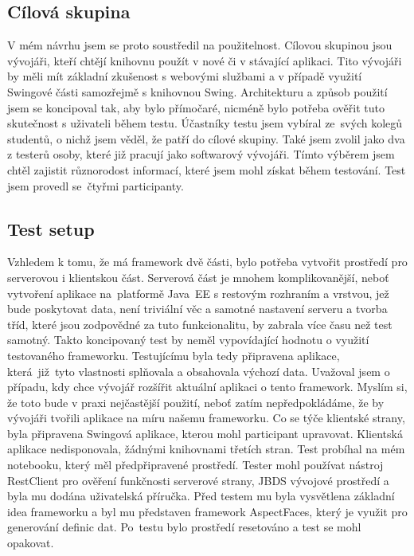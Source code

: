 \subsection{Cílová skupina}
V mém návrhu jsem se proto soustředil na použitelnost. Cílovou skupinou jsou vývojáři, kteří chtějí knihovnu použít v nové či v stávající aplikaci. Tito vývojáři by měli mít základní zkušenost s webovými službami a v případě využití Swingové části samozřejmě s knihovnou Swing. Architekturu a způsob použití jsem se koncipoval tak, aby bylo přímočaré, nicméně bylo potřeba ověřit tuto skutečnost s uživateli během testu. Účastníky testu jsem vybíral ze~svých kolegů studentů, o nichž jsem věděl, že patří do cílové skupiny. Také jsem zvolil jako dva z testerů osoby, které již pracují jako softwarový vývojáři. Tímto výběrem jsem chtěl zajistit různorodost informací, které jsem mohl získat během testování. Test jsem provedl se~čtyřmi participanty.

\subsection{Test setup}
Vzhledem k tomu, že má framework dvě části, bylo potřeba vytvořit prostředí pro serverovou i klientskou část. Serverová část je mnohem komplikovanější, neboť vytvoření aplikace na~platformě Java~EE s restovým rozhraním a vrstvou, jež bude poskytovat data, není triviální věc a samotné nastavení serveru a tvorba tříd, které jsou zodpovědné za tuto funkcionalitu, by zabrala více času než test samotný. Takto koncipovaný test by neměl vypovídající hodnotu o využití testovaného frameworku. Testujícímu byla tedy připravena aplikace, která~již~tyto vlastnosti splňovala a obsahovala výchozí data. Uvažoval jsem o případu, kdy chce vývojář rozšířit aktuální aplikaci o tento framework. Myslím si, že toto bude v praxi nejčastější použití, neboť zatím nepředpokládáme, že by vývojáři tvořili aplikace na míru našemu frameworku. Co se týče klientské strany, byla připravena Swingová aplikace, kterou mohl participant upravovat. Klientská aplikace nedisponovala, žádnými knihovnami třetích stran. Test probíhal na mém notebooku, který měl předpřipravené prostředí. Tester mohl používat nástroj RestClient pro ověření funkčnosti serverové strany, JBDS vývojové prostředí a byla mu dodána uživatelská příručka. Před testem mu byla vysvětlena základní idea frameworku a byl mu představen framework AspectFaces, který je využit pro generování definic dat. Po~testu bylo prostředí resetováno a test se mohl opakovat.

